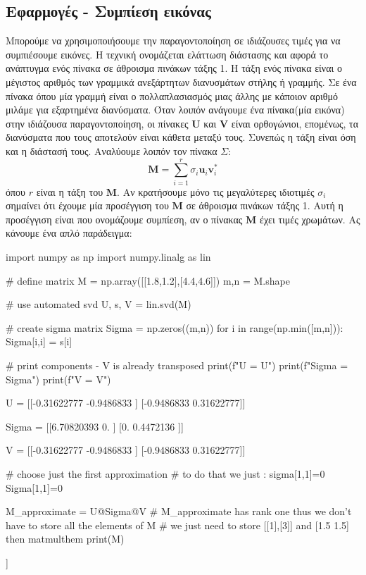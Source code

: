 \subsection{Εφαρμογές - Συμπίεση εικόνας}
Μπορούμε να χρησιμοποιήσουμε την παραγοντοποίηση σε ιδιάζουσες τιμές για να συμπιέσουμε εικόνες. Η τεχνική ονομάζεται ελάττωση διάστασης και αφορά το ανάπτυγμα ενός πίνακα σε άθροισμα πινάκων τάξης 1. H τάξη ενός πίνακα είναι ο μέγιστος αριθμός των γραμμικά ανεξάρτητων διανυσμάτων στήλης ή γραμμής. Σε ένα πίνακα όπου μία γραμμή είναι ο πολλαπλασιασμός μιας άλλης με κάποιον αριθμό μιλάμε για εξαρτημένα διανύσματα. Όταν λοιπόν ανάγουμε ένα πίνακα(μία εικόνα) στην ιδιάζουσα παραγοντοποίηση, οι πίνακες $\mathbf{U}$ και $\mathbf{V}$ είναι ορθογώνιοι, επομένως, τα διανύσματα που τους αποτελούν είναι κάθετα μεταξύ τους. Συνεπώς η τάξη είναι όση και η διάστασή τους. Αναλύουμε λοιπόν τον πίνακα $\Sigma$:
\begin{equation}
\mathbf{M}=\sum_{i=1}^r \sigma_i \mathbf{u}_i \mathbf{v}_i^*
\end{equation}
όπου $r$ είναι η τάξη του $\mathbf{M}$.  Αν κρατήσουμε μόνο τις μεγαλύτερες ιδιοτιμές $\sigma_i$ σημαίνει ότι έχουμε μία προσέγγιση του $\mathbf{M}$ σε άθροισμα πινάκων τάξης 1. Αυτή η προσέγγιση είναι που ονομάζουμε συμπίεση, αν ο πίνακας $\mathbf{M}$ έχει τιμές χρωμάτων. Ας κάνουμε ένα απλό παράδειγμα:

\en
\begin{python}
import numpy as np
import numpy.linalg as lin

# define matrix
M = np.array([[1.8,1.2],[4.4,4.6]])
m,n = M.shape

# use automated svd
U, s, V = lin.svd(M)

# create sigma matrix
Sigma = np.zeros((m,n))
for i in range(np.min([m,n])):
    Sigma[i,i] = s[i]

# print components - V is already transposed
print(f"U = {U}\n")
print(f"Sigma = {Sigma}\n")
print(f"V = {V}")
\end{python}
\vspace*{-0.7cm}
\begin{codeout}
U = [[-0.31622777 -0.9486833 ]
 [-0.9486833   0.31622777]]

Sigma = [[6.70820393 0.        ]
 [0.         0.4472136 ]]

V = [[-0.31622777 -0.9486833 ]
 [-0.9486833   0.31622777]]
\end{codeout}
\gr

\en
\begin{python}
# choose just the first approximation
# to do that we just : sigma[1,1]=0
Sigma[1,1]=0

M_approximate = U@Sigma@V
# M_approximate has rank one thus we don't have to store all the elements of M
# we just need to store [[1],[3]] and [1.5 1.5] then matmulthem
print(M)
\end{python}
\vspace*{-0.7cm}
\begin{codeout}
[[1.8 1.2]
 [4.4 4.6]]
\end{codeout}
\gr
